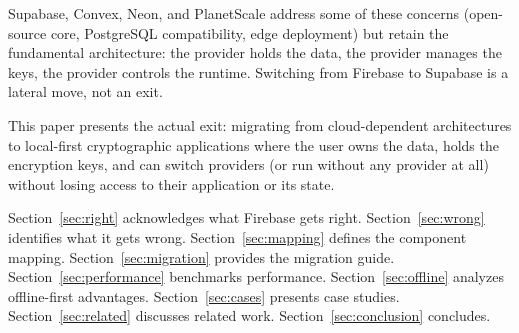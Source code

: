 Supabase, Convex, Neon, and PlanetScale address some of these concerns
(open-source core, PostgreSQL compatibility, edge deployment) but retain
the fundamental architecture: the provider holds the data, the provider
manages the keys, the provider controls the runtime. Switching from
Firebase to Supabase is a lateral move, not an exit.

This paper presents the actual exit: migrating from cloud-dependent
architectures to local-first cryptographic applications where the user
owns the data, holds the encryption keys, and can switch providers
(or run without any provider at all) without losing access to their
application or its state.

Section~\ref{sec:right} acknowledges what Firebase gets right.
Section~\ref{sec:wrong} identifies what it gets wrong.
Section~\ref{sec:mapping} defines the component mapping.
Section~\ref{sec:migration} provides the migration guide.
Section~\ref{sec:performance} benchmarks performance.
Section~\ref{sec:offline} analyzes offline-first advantages.
Section~\ref{sec:cases} presents case studies.
Section~\ref{sec:related} discusses related work.
Section~\ref{sec:conclusion} concludes.

